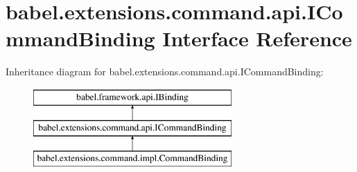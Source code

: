 \hypertarget{interfacebabel_1_1extensions_1_1command_1_1api_1_1_i_command_binding}{\section{babel.\-extensions.\-command.\-api.\-I\-Command\-Binding Interface Reference}
\label{interfacebabel_1_1extensions_1_1command_1_1api_1_1_i_command_binding}
}
Inheritance diagram for babel.\-extensions.\-command.\-api.\-I\-Command\-Binding\-:\begin{figure}[H]
\begin{center}
\leavevmode
\includegraphics[height=3.000000cm]{interfacebabel_1_1extensions_1_1command_1_1api_1_1_i_command_binding}
\end{center}
\end{figure}
